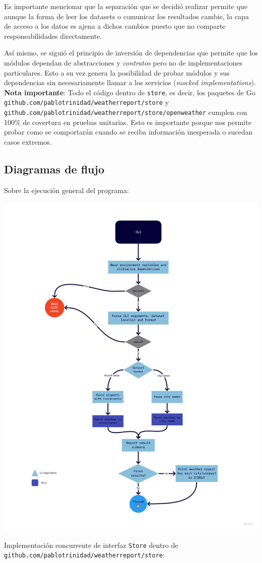 \documentclass[10pt, letterpaper]{article}
\begin{document}
Es importante mencionar que la separación que se decidió realizar permite que aunque la forma
de leer los datasets o comunicar los resultados cambie, la capa de acceso a los datos es ajena
a dichos cambios puesto que no comparte responsabilidades directamente.

Así mismo, se siguió el principio de inversión de dependencias que permite que los módulos
dependan de abstracciones y \textit{contratos} pero no de implementaciones particulares.
Esto a su vez genera la posibilidad de probar módulos y sus dependencias sin necesariamente
llamar a los servicios (\textit{mocked implementations}).\\

\textbf{Nota importante}: Todo el código dentro de \texttt{store}, es decir, los paquetes de Go \\
\texttt{github.com/pablotrinidad/weatherreport/store} y\\
\texttt{github.com/pablotrinidad/weatherreport/store/openweather}
cumplen con 100\% de covertura en pruebas unitarias. Esto es importante porque nos permite probar
como se comportarán cuando se reciba información inesperada o sucedan casos extremos.

\subsection{Diagramas de flujo}
Sobre la ejecución general del programa:
\begin{center}
  \includegraphics[scale=0.5]{flow-chart-1.jpg}
\end{center}
\clearpage
Implementación concurrente de interfaz \texttt{Store} dentro de\\
\texttt{github.com/pablotrinidad/weatherreport/store}:
\end{document}

